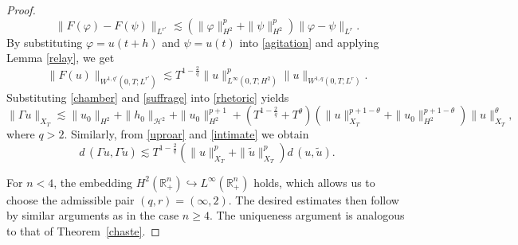 \documentclass[preprint,compress,12pt]{elsarticle}
\numberwithin{equation}{section}
\begin{document}
\begin{proof}
	\begin{equation}\label{agitation}
		\|F(\varphi)-F(\psi)\|_{L^{r'}}\lesssim \left(\|\varphi\|_{H^{2}}^{p}+ \|\psi\|_{H^{2}}^{p}\right) \|\varphi-\psi\|_{L^{r}}.
	\end{equation}
	By substituting $\varphi=u(t+h)$ and $\psi=u(t)$ into \eqref{agitation} and applying Lemma \ref{relay}, we get
	\begin{equation}\label{suffrage}
		\|F(u)\|_{W^{1,q'}(0,T;L^{r'})}\lesssim T^{1-\frac{2}{q}} \|u\|_{L^{\infty}(0,T;H^{2})}^{p} \|u\|_{W^{1,q}(0,T;L^{r})}.
	\end{equation}
	Substituting \eqref{chamber} and \eqref{suffrage} into \eqref{rhetoric} yields
	\begin{equation}\label{longevity}
		\|\Gamma u\|_{X_{T}}\lesssim	 \|u_{0}\|_{H^{2}}+\|h_{0}\|_{\mathcal{H}^{2}}+\|u_{0}\|_{H^{2}}^{p+1}+\left(T^{1-\frac{2}{q}}+T^{\theta}\right) \left(\|u\|_{X_{T}}^{p+1-\theta}+\|u_{0}\|_{H^{2}}^{p+1-\theta}\right)\|u\|_{X_{T}}^{\theta},
	\end{equation}
	where $q>2$. Similarly, from \eqref{uproar} and \eqref{intimate} we obtain
	\begin{equation}
		d\,(\Gamma u,\Gamma \tilde{u})\lesssim T^{1-\frac{2}{q}} \left(\|u\|_{X_{T}}^{p}+\|\tilde{u}\|_{X_{T}}^{p}\right)d\,(u,\tilde{u}).
	\end{equation}
	
	For $n<4$, the embedding $H^{2}(\mathbb{R}_{+}^{n})\hookrightarrow L^{\infty}(\mathbb{R}_{+}^{n})$ holds, which allows us to choose the  admissible pair $(q, r)=(\infty, 2)$. The desired estimates then follow by similar arguments as in the case $n\geq4$. The uniqueness argument is analogous to that of Theorem~\ref{chaste}.
\end{proof}
\end{document}
